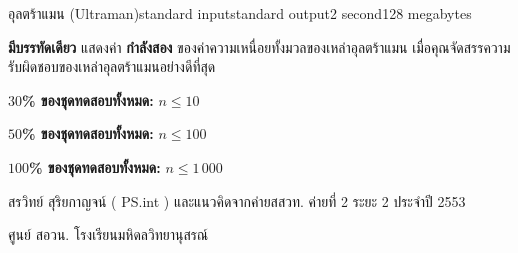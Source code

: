 \documentclass[11pt,a4paper]{article}
\begin{document}
\begin{problem}{อุลตร้าแมน (Ultraman)}{standard input}{standard output}{2 second}{128 megabytes}
\OutputFile

\textbf{มีบรรทัดเดียว} แสดงค่า \textbf{กำลังสอง} ของค่าความเหนื่อยทั้งมวลของเหล่าอุลตร้าแมน เมื่อคุณจัดสรรความรับผิดชอบของเหล่าอุลตร้าแมนอย่างดีที่สุด

\Examples

\begin{example}
%
%
\end{example}

\newpage
\Scoring 

\textbf{$30$\% ของชุดทดสอบทั้งหมด:} $n \leq 10$

\textbf{$50$\% ของชุดทดสอบทั้งหมด:} $n \leq 100$
           
\textbf{$100$\% ของชุดทดสอบทั้งหมด:} $n \leq 1\,000$
            
\Source

สรวิทย์  สุริยกาญจน์ ( PS.int ) และแนวคิดจากค่ายสสวท. ค่ายที่ 2 ระยะ 2 ประจำปี 2553

ศูนย์ สอวน. โรงเรียนมหิดลวิทยานุสรณ์

\end{problem}
\end{document}
